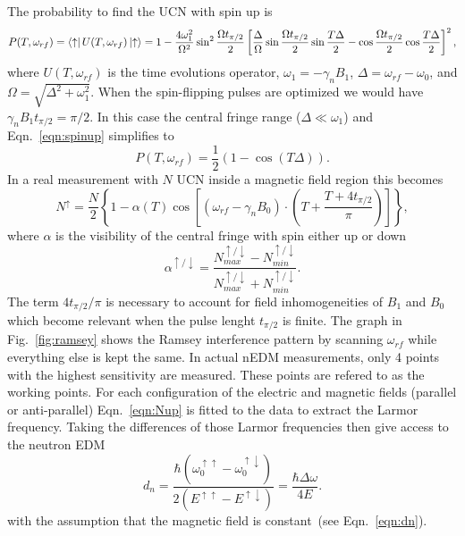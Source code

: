 The probability to find the UCN with spin up is
\begin{equation}
  \label{eqn:spinup}
  P(T, \omega_{rf}) = \bra{\uparrow} U(T, \omega_{rf}) \ket{\uparrow}
  = 1 - \frac{4 \omega_1^2}{\Omega^2} \sin ^2 \frac{\Omega t_{\pi/2}}{2} \left[ \frac{\Delta}{\Omega} \sin  \frac{\Omega t_{\pi/2}}{2} \sin \frac{T\Delta}{2} - \cos  \frac{\Omega t_{\pi/2}}{2} \cos\frac{T\Delta}{2} \right]^2,
\end{equation}
where $U(T, \omega_{rf})$ is the time evolutions operator,
$\omega_1 = - \gamma_n B_1$, $\Delta = \omega_{rf} - \omega_0$, and
$\Omega = \sqrt{\Delta^2 + \omega_1^2}$. When the spin-flipping pulses
are optimized we would have $\gamma_n B_1 t_{\pi/2} = \pi / 2$. In
this case the central fringe range ($\Delta \ll \omega_1$) and
Eqn.~\ref{eqn:spinup} simplifies to
\begin{equation}
  P(T, \omega_{rf}) = \frac{1}{2} \left( 1 - \cos(T\Delta) \right).
\end{equation}
In a real measurement with $N$ UCN inside a magnetic field region this
becomes
\begin{equation}
  \label{eqn:Nup}
N^{\uparrow} = \frac{N}{2} \left\lbrace 1 - \alpha(T) \cos \left[ (\omega_{rf} - \gamma_n B_0 ) \cdot \left(T+\frac{T+4t_{\pi/2}}{\pi}\right)\right]\right\rbrace,
\end{equation}
where $\alpha$ is the visibility of the central fringe with spin
either up or down
\begin{equation}
  \label{eqn:visibility}
  \alpha^{\uparrow /\downarrow} = \frac{N_{max}^{\uparrow /\downarrow} - N_{min}^{\uparrow /\downarrow}}{N_{max}^{\uparrow /\downarrow}+ N_{min}^{\uparrow /\downarrow}}.
\end{equation}
The term $4t_{\pi/2}/\pi$ is necessary to account for field
inhomogeneities of $B_1$ and $B_0$ which become relevant when the
pulse lenght $t_{\pi/2}$ is finite. The graph in Fig.~\ref{fig:ramsey}
shows the Ramsey interference pattern by scanning $\omega_{rf}$ while
everything else is kept the same. In actual nEDM measurements, only 4
points with the highest sensitivity are measured. These points are
refered to as the working points. For each configuration of the
electric and magnetic fields (parallel or anti-parallel)
Eqn.~\ref{eqn:Nup} is fitted to the data to extract the Larmor
frequency. Taking the differences of those Larmor frequencies then
give access to the neutron EDM
\begin{equation}
  \label{eqn:fitteddn}
  d_n = \frac{\hbar (\omega_0 ^{\uparrow \uparrow} - \omega_0 ^{\uparrow \downarrow})}{2(E^{\uparrow \uparrow} - E^{\uparrow \downarrow})} = \frac{\hbar \Delta \omega}{4E}.
\end{equation}
with the assumption that the magnetic field is constant~(see
Eqn.~\ref{eqn:dn}).


